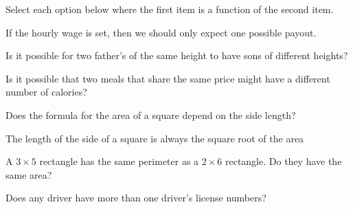 \documentclass{ximera}
\begin{document}
\begin{question}
Select each option below where the first item is a function of the second item.
  \begin{solution}
    \begin{multiple-choice}
    \end{multiple-choice}
    \begin{hint}
    If the hourly wage is set, then we should only expect one possible payout.
    \end{hint}
    \begin{hint}
    Is it possible for two father's of the same height to have sons of different heights?
    \end{hint}
    \begin{hint}
    Is it possible that two meals that share the same price might have a different number of calories?
    \end{hint}
    \begin{hint}
    Does the formula for the area of a square depend on the side length?
    \end{hint}
    \begin{hint}
    The length of the side of a square is always the square root of the area
    \end{hint}
    \begin{hint}
    A $3\times 5$ rectangle has the same perimeter as a $2\times 6$ rectangle. Do they have the same area?
    \end{hint}
    \begin{hint}
    Does any driver have more than one driver's license numbers?
    \end{hint}
  \end{solution}
\end{question}
\end{document}
